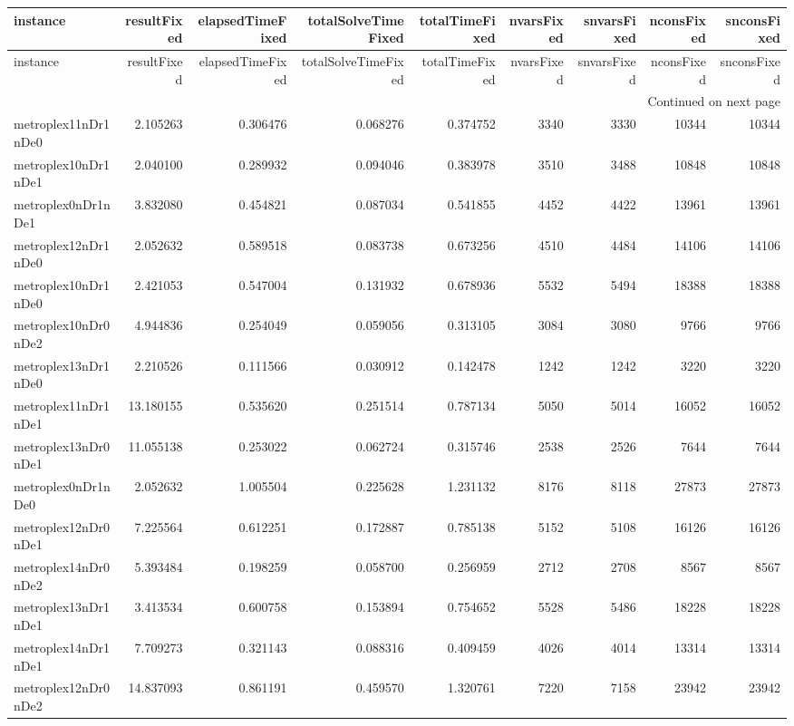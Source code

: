 \begin{longtable}{|l|r|r|r|r|r|r|r|r|}
\toprule
instance & resultFixed & elapsedTimeFixed & totalSolveTimeFixed & totalTimeFixed & nvarsFixed & snvarsFixed & nconsFixed & snconsFixed \\
\midrule
\endfirsthead
\toprule
instance & resultFixed & elapsedTimeFixed & totalSolveTimeFixed & totalTimeFixed & nvarsFixed & snvarsFixed & nconsFixed & snconsFixed \\
\midrule
\endhead
\midrule
\multicolumn{9}{r}{Continued on next page} \\
\midrule
\endfoot
\bottomrule
\endlastfoot
metroplex11nDr1nDe0 & 2.105263 & 0.306476 & 0.068276 & 0.374752 & 3340 & 3330 & 10344 & 10344 \\
metroplex10nDr1nDe1 & 2.040100 & 0.289932 & 0.094046 & 0.383978 & 3510 & 3488 & 10848 & 10848 \\
metroplex0nDr1nDe1 & 3.832080 & 0.454821 & 0.087034 & 0.541855 & 4452 & 4422 & 13961 & 13961 \\
metroplex12nDr1nDe0 & 2.052632 & 0.589518 & 0.083738 & 0.673256 & 4510 & 4484 & 14106 & 14106 \\
metroplex10nDr1nDe0 & 2.421053 & 0.547004 & 0.131932 & 0.678936 & 5532 & 5494 & 18388 & 18388 \\
metroplex10nDr0nDe2 & 4.944836 & 0.254049 & 0.059056 & 0.313105 & 3084 & 3080 & 9766 & 9766 \\
metroplex13nDr1nDe0 & 2.210526 & 0.111566 & 0.030912 & 0.142478 & 1242 & 1242 & 3220 & 3220 \\
metroplex11nDr1nDe1 & 13.180155 & 0.535620 & 0.251514 & 0.787134 & 5050 & 5014 & 16052 & 16052 \\
metroplex13nDr0nDe1 & 11.055138 & 0.253022 & 0.062724 & 0.315746 & 2538 & 2526 & 7644 & 7644 \\
metroplex0nDr1nDe0 & 2.052632 & 1.005504 & 0.225628 & 1.231132 & 8176 & 8118 & 27873 & 27873 \\
metroplex12nDr0nDe1 & 7.225564 & 0.612251 & 0.172887 & 0.785138 & 5152 & 5108 & 16126 & 16126 \\
metroplex14nDr0nDe2 & 5.393484 & 0.198259 & 0.058700 & 0.256959 & 2712 & 2708 & 8567 & 8567 \\
metroplex13nDr1nDe1 & 3.413534 & 0.600758 & 0.153894 & 0.754652 & 5528 & 5486 & 18228 & 18228 \\
metroplex14nDr1nDe1 & 7.709273 & 0.321143 & 0.088316 & 0.409459 & 4026 & 4014 & 13314 & 13314 \\
metroplex12nDr0nDe2 & 14.837093 & 0.861191 & 0.459570 & 1.320761 & 7220 & 7158 & 23942 & 23942 \\

\end{longtable}
